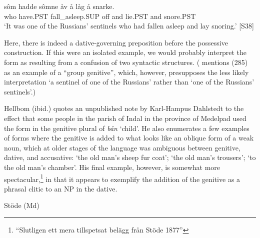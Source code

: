  \ea\label{}
\gll sôm  hadde  sômne  åv  å  låg  å  snarke.\\


who  have.PST  fall\_asleep.SUP  off  and  lie.PST  and  snore.PST\\

\glt  ‘It was one of the Russians’ sentinels who had fallen asleep and lay snoring.’ [S38]

\z

Here, there is indeed a dative-governing preposition before the possessive construction. If this were an isolated example, we would probably interpret the form  as resulting from a confusion of two syntactic structures. (\citet[38]{Delsing2003a} mentions (285) as an example of a “group genitive”, which, however, presupposes the less likely interpretation ‘a sentinel of one of the Russians’ rather than ‘one of the Russians’ sentinels’.) 


Hellbom (ibid.) quotes an unpublished note by Karl-Hampus Dahlstedt to the effect that some people in the parish of Indal in the province of Medelpad used the form  in the genitive plural of \textit{bån} ‘child’. He also enumerates a few examples of forms where the genitive is added to what looks like an oblique form of a weak noun, which at older stages of the language was ambiguous between genitive, dative, and accusative:  ‘the old man’s sheep fur coat’;  ‘the old man’s trousers’;  ‘to the old man’s chamber’. His final example, however, is somewhat more spectacular,\footnote{ “Slutligen ett mera tillspetsat belägg från Stöde 1877”} in that it appears to exemplify the addition of the genitive as a phrasal clitic to an NP in the dative. 


\item 

Stöde (Md)

